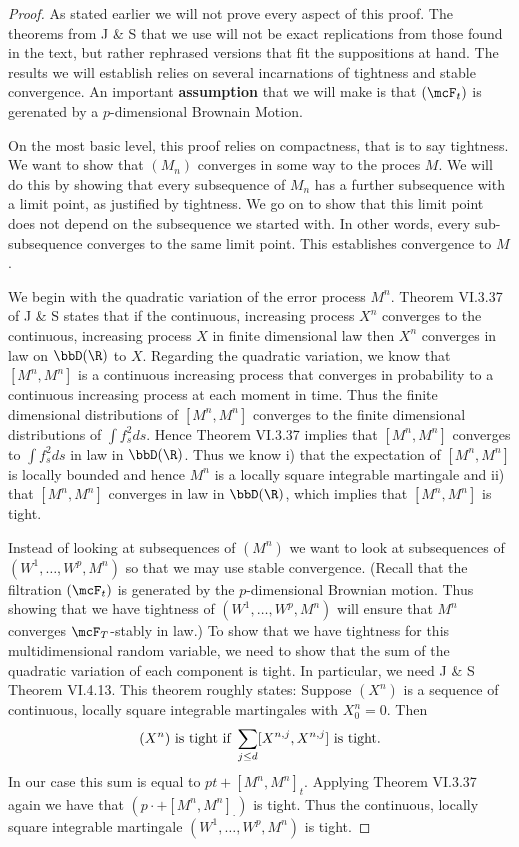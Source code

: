 \documentclass{report}
\begin{document}
\begin{proof}
As stated earlier we will not prove every aspect of this proof.  The
theorems from J \& S that we use will not be exact replications from
those found in the text, but rather rephrased versions that fit the
suppositions at hand.  The results we will establish relies on several
incarnations of tightness and stable convergence.  An important
\textbf{assumption} that we will make is that $(\mcF_t)$ is gerenated
by a $p$-dimensional Brownain Motion.

On the most basic level, this proof relies on compactness, that is to
say tightness.  We want to show that $(M_n)$ converges in some way to
the proces $M$.  We will do this by showing that every subsequence of
$M_n$ has a further subsequence with a limit point, as justified by
tightness.  We go on to show that this limit point does not depend on
the subsequence we started with.  In other words, every
sub-subsequence converges to the same limit point.  This establishes
convergence to $M$.

We begin with the quadratic variation of the error process $M^n$. 
Theorem VI.3.37 of J \& S states that if the continuous, increasing
process $X^n$ converges to the continuous, increasing process $X$ in
finite dimensional law then $X^n$ converges in law on $\bbD(\R)$ to
$X$.  Regarding the quadratic variation, we know that $[M^n,M^n]$ is a
continuous increasing process that converges in probability to a
continuous increasing process at each moment in time.  Thus the finite
dimensional distributions of $[M^n,M^n]$ converges to the finite
dimensional distributions of $\int f_s^2 ds$.  Hence Theorem VI.3.37
implies that $[M^n,M^n]$ converges to $\int f_s^2 ds$ in law in
$\bbD(\R)$.   Thus we know i) that the expectation of $[M^n,M^n]$ is
locally bounded and hence $M^n$ is a locally square integrable
martingale and ii) that $[M^n,M^n]$ converges in law in $\bbD(\R)$,
which implies that $[M^n,M^n]$ is tight. 

Instead of looking at subsequences of $(M^n)$ we want to look at
subsequences of \\ $(W^1, \ldots, W^p, M^n)$ so that we may use stable
convergence.  (Recall that the filtration $(\mcF_t)$ is generated by
the $p$-dimensional Brownian motion.  Thus showing that we have
tightness of $(W^1, \ldots, W^p, M^n)$ will ensure that $M^n$
converges $\mcF_T$-stably in law.)  To show that we have tightness for
this multidimensional random variable, we need to show that the sum of
the quadratic variation of each component is tight.  In particular, we
need J \& S Theorem VI.4.13.  This theorem roughly states:  Suppose
$(X^n)$ is a sequence of continuous, locally square integrable
martingales with $X^n_0 = 0$.  Then 
\[
(X^n) \textmd{ is tight if } \sum_{j \leq d} [X^{n,j},X^{n,j}]
\textmd{ is tight.}
\]
In our case this sum is equal to $pt + [M^n,M^n]_t$.  Applying Theorem
VI.3.37 again we have that $(p \cdot + [M^n,M^n]_\cdot)$ is tight. 
Thus the continuous, locally square integrable martingale $(W^1,
\ldots, W^p, M^n)$ is tight.


\end{proof}
\end{document}
